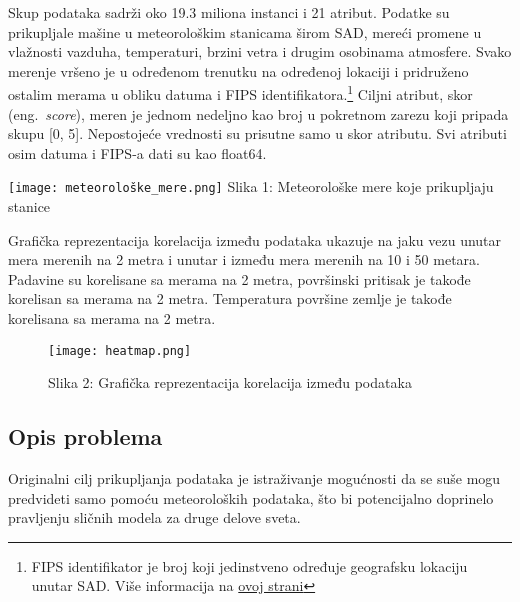 \documentclass[a4paper]{article}
\begin{document}
{\noindent\begin{minipage}{0.4\textwidth}
Skup podataka sadrži oko 19.3 miliona instanci i 21 atribut. Podatke su prikupljale mašine u meteorološkim stanicama širom SAD, mereći promene u vlažnosti vazduha, temperaturi, brzini vetra i drugim osobinama atmosfere. Svako merenje vršeno je u određenom trenutku na određenoj lokaciji i pridruženo ostalim merama u obliku datuma i FIPS identifikatora.\footnote[1]{FIPS identifikator je broj koji jedinstveno određuje geografsku lokaciju unutar SAD. Više informacija na \href{https://www.nrcs.usda.gov/wps/portal/nrcs/detail/national/home/?cid=nrcs143_013697}{ovoj strani}} Ciljni atribut, skor (eng.~{\em score}), meren je jednom nedeljno kao broj u pokretnom zarezu koji pripada skupu [0, 5]. Nepostojeće vrednosti su prisutne samo u skor atributu. Svi atributi osim datuma i FIPS-a dati su kao float64.
\end{minipage}
\noindent\begin{minipage}{0.1\textwidth}
\hphantom{a}
\end{minipage}
\noindent\begin{minipage}{0.4\textwidth}
\texttt{[image: meteorološke\_mere.png]}
Slika 1: Meteorološke mere koje prikupljaju stanice\\
\end{minipage}
Grafička reprezentacija korelacija između podataka ukazuje na jaku vezu unutar mera merenih na 2 metra i unutar i između mera merenih na 10 i 50 metara. Padavine su korelisane sa merama na 2 metra, površinski pritisak je takođe korelisan sa merama na 2 metra. Temperatura površine zemlje je takođe korelisana sa merama na 2 metra.

\noindent\begin{figure}[h!]
\begin{center}
\texttt{[image: heatmap.png]}
\end{center}
\hphantom{aaaaaaaaaaaaaa}Slika 2: Grafička reprezentacija korelacija između podataka
\label{fig:heatmap}
\end{figure}

\subsection{Opis problema}
\label{subsec:opis_problema}

\begin{minipage}{0.6\textwidth}
Originalni cilj prikupljanja podataka je istraživanje mogućnosti da se suše mogu predvideti samo pomoću meteoroloških podataka, što bi potencijalno doprinelo pravljenju sličnih modela za druge delove sveta.


\end{minipage}}
\end{document}
